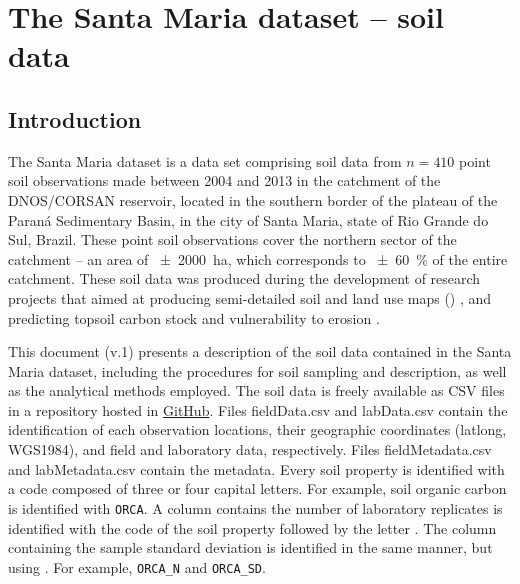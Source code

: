 
\artigofalse
\chapter{The Santa Maria dataset -- soil data}
\label{apen:soil-data}

\tocless\section{Introduction}

The Santa Maria dataset is a data set comprising soil data from $n = 410$ point soil observations 
made between 2004 and 2013 in the catchment of the DNOS/CORSAN reservoir, located in the southern 
border of the plateau of the Paraná Sedimentary Basin, in the city of Santa Maria, state of Rio 
Grande do Sul, Brazil. These point soil observations cover the northern sector of the catchment -- 
an area of \SI{\pm2000}{\hectare}, which corresponds to \SI{\pm60}{\percent} of the entire 
catchment. These soil data was produced during the development of research projects that aimed at 
producing semi-detailed soil and land use maps () \cite{Pedron2005, Miguel2010, 
SamuelRosaEtAl2011a, MiguelEtAl2012}, and predicting topsoil carbon stock and vulnerability to erosion 
\cite{Samuel-Rosa2009, MouraBueno2012, Miguel2013}.

This document (v.1) presents a description of the soil data contained in the Santa Maria dataset, 
including the procedures for soil sampling and description, as well as the analytical methods 
employed. The soil data is freely available as CSV files in a repository hosted in
\href{https://github.com/samuel-rosa/dnos-sm-rs-general/tree/master/data}{GitHub}. Files 
fieldData.csv and labData.csv contain the identification of each observation locations, their 
geographic coordinates (latlong, WGS1984), and field and laboratory data, respectively. Files 
fieldMetadata.csv and labMetadata.csv contain the metadata. Every soil property is identified with a 
code composed of three or four capital letters. For example, soil organic carbon is identified with 
\texttt{ORCA}. A column contains the number of laboratory replicates is identified with the code of 
the soil property followed by the letter . The column containing the sample standard deviation 
is identified in the same manner, but using . For example, \texttt{ORCA\_N} and \texttt{ORCA\_SD}.


